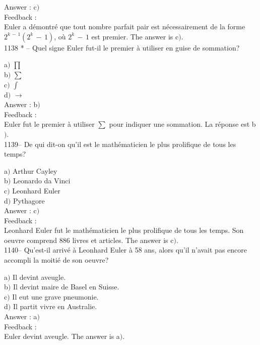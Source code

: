 \documentclass[letterpaper, 12pt]{article}
\begin{document}
Answer : c$)$\\

Feedback : \\
Euler a d\'emontr\'e que tout nombre parfait pair est
n\'ecessairement de la forme $2^{k\,-\,1}(2^k\,-\,1)$, o\`u
$2^k\,-\,1$ est premier.
The answer is c$)$.\\

1138 * -- Quel signe Euler fut-il le premier \`a utiliser en guise
de sommation?

a$)$ $\prod$ \\[1mm]
b$)$ $\sum$  \\[1mm]
c$)$ $\int$   \\[1mm]
d$)$ $\to$  \\

Answer : b$)$\\

Feedback : \\
Euler fut le premier \`a utiliser $\sum$ pour indiquer une sommation. La
r\'eponse est b$)$. \\

1139-- De qui dit-on qu'il est le math\'ematicien le plus prolifique
de tous les temps?

a$)$ Arthur Cayley \\
b$)$ Leonardo da Vinci  \\
c$)$ Leonhard Euler   \\
d$)$ Pythagore  \\

Answer : c$)$\\

Feedback : \\
Leonhard Euler fut le math\'ematicien le plus prolifique de tous les temps.
Son oeuvre comprend 886 livres et articles. The answer is c$)$. \\

1140-- Qu'est-il arriv\'e \`a Leonhard Euler \`a 58 ans, alors qu'il
n'avait pas encore accompli la moiti\'e de son oeuvre?

a$)$ Il devint aveugle. \\
b$)$ Il devint maire de Basel en Suisse.   \\
c$)$ Il eut une grave pneumonie.   \\
d$)$ Il partit vivre en Australie.  \\

Answer : a$)$\\

Feedback : \\
Euler devint aveugle. The answer is a$)$. \\
\end{document}
